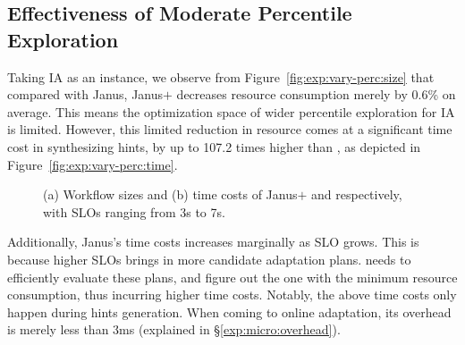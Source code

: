 \subsection{Effectiveness of Moderate Percentile Exploration}
\label{exp:micro:vary-perc}

Taking IA as an instance, we observe from Figure~\ref{fig:exp:vary-perc:size} that compared with Janus, Janus$+$ decreases resource consumption merely by 0.6\% on average. This means the optimization space of wider percentile exploration for IA is limited.
However, this limited reduction in resource comes at a significant time cost in synthesizing hints, by up to 107.2 times higher than \namex, as depicted in Figure~\ref{fig:exp:vary-perc:time}.

\begin{figure}[t!]
    \centering
	\hfill
	\caption{(a) Workflow sizes and (b) time costs of Janus$+$ and \namex respectively, with SLOs ranging from 3s to 7s.}
\end{figure}

Additionally, Janus's time costs increases marginally as SLO grows.
This is because higher SLOs brings in more candidate adaptation plans.
\namex needs to efficiently evaluate these plans, and figure out the one with the minimum resource consumption, thus incurring higher time costs.
Notably,  the above time costs only happen during hints generation.
When coming to online adaptation,  its overhead is merely less than 3ms (explained in \S\ref{exp:micro:overhead}).

